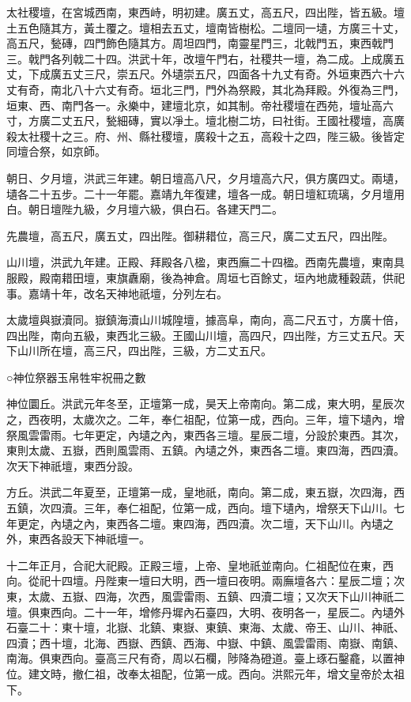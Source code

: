 太社稷壇，在宮城西南，東西峙，明初建。廣五丈，高五尺，四出陛，皆五級。壇土五色隨其方，黃土覆之。壇相去五丈，壇南皆樹松。二壇同一壝，方廣三十丈，高五尺，甃磚，四門飾色隨其方。周坦四門，南靈星門三，北戟門五，東西戟門三。戟門各列戟二十四。洪武十年，改壇午門右，社稷共一壇，為二成。上成廣五丈，下成廣五丈三尺，崇五尺。外壝崇五尺，四面各十九丈有奇。外垣東西六十六丈有奇，南北八十六丈有奇。垣北三門，門外為祭殿，其北為拜殿。外復為三門，垣東、西、南門各一。永樂中，建壇北京，如其制。帝社稷壇在西苑，壇址高六寸，方廣二丈五尺，甃細磚，實以凈土。壇北樹二坊，曰社街。王國社稷壇，高廣殺太社稷十之三。府、州、縣社稷壇，廣殺十之五，高殺十之四，陛三級。後皆定同壇合祭，如京師。

朝日、夕月壇，洪武三年建。朝日壇高八尺，夕月壇高六尺，俱方廣四丈。兩壝，壝各二十五步。二十一年罷。嘉靖九年復建，壇各一成。朝日壇紅琉璃，夕月壇用白。朝日壇陛九級，夕月壇六級，俱白石。各建天門二。

先農壇，高五尺，廣五丈，四出陛。御耕耤位，高三尺，廣二丈五尺，四出陛。

山川壇，洪武九年建。正殿、拜殿各八楹，東西廡二十四楹。西南先農壇，東南具服殿，殿南耤田壇，東旗纛廟，後為神倉。周垣七百餘丈，垣內地歲種穀蔬，供祀事。嘉靖十年，改名天神地祇壇，分列左右。

太歲壇與嶽瀆同。嶽鎮海瀆山川城隍壇，據高阜，南向，高二尺五寸，方廣十倍，四出陛，南向五級，東西北三級。王國山川壇，高四尺，四出陛，方三丈五尺。天下山川所在壇，高三尺，四出陛，三級，方二丈五尺。

○神位祭器玉帛牲牢祝冊之數

神位圜丘。洪武元年冬至，正壇第一成，昊天上帝南向。第二成，東大明，星辰次之，西夜明，太歲次之。二年，奉仁祖配，位第一成，西向。三年，壇下壝內，增祭風雲雷雨。七年更定，內壝之內，東西各三壇。星辰二壇，分設於東西。其次，東則太歲、五嶽，西則風雲雨、五鎮。內壝之外，東西各二壇。東四海，西四瀆。次天下神祇壇，東西分設。

方丘。洪武二年夏至，正壇第一成，皇地祇，南向。第二成，東五嶽，次四海，西五鎮，次四瀆。三年，奉仁祖配，位第一成，西向。壇下壝內，增祭天下山川。七年更定，內壝之內，東西各二壇。東四海，西四瀆。次二壇，天下山川。內壝之外，東西各設天下神祇壇一。

十二年正月，合祀大祀殿。正殿三壇，上帝、皇地祇並南向。仁祖配位在東，西向。從祀十四壇。丹陛東一壇曰大明，西一壇曰夜明。兩廡壇各六：星辰二壇；次東，太歲、五嶽、四海，次西，風雲雷雨、五鎮、四瀆二壇；又次天下山川神祇二壇。俱東西向。二十一年，增修丹墀內石臺四，大明、夜明各一，星辰二。內壝外石臺二十：東十壇，北嶽、北鎮、東嶽、東鎮、東海、太歲、帝王、山川、神祇、四瀆；西十壇，北海、西嶽、西鎮、西海、中嶽、中鎮、風雲雷雨、南嶽、南鎮、南海。俱東西向。臺高三尺有奇，周以石欄，陟降為磴道。臺上琢石鑿龕，以置神位。建文時，撤仁祖，改奉太祖配，位第一成。西向。洪熙元年，增文皇帝於太祖下。

